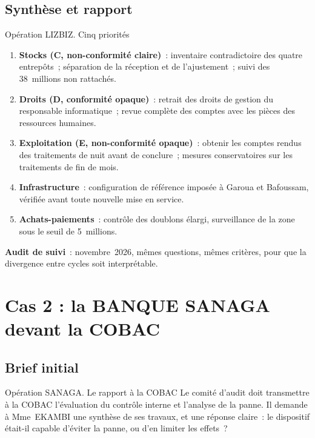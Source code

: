 \subsection{Synthèse et rapport}

\begin{boxscenario}{Opération LIZBIZ. Cinq priorités}
\begin{enumerate}
    \item \textbf{Stocks (C, non-conformité claire)}~: inventaire
          contradictoire des quatre entrepôts~; séparation de la réception
          et de l'ajustement~; suivi des 38~millions non rattachés.
    \item \textbf{Droits (D, conformité opaque)}~: retrait des droits de
          gestion du responsable informatique~; revue complète des comptes
          avec les pièces des ressources humaines.
    \item \textbf{Exploitation (E, non-conformité opaque)}~: obtenir les
          comptes rendus des traitements de nuit avant de conclure~;
          mesures conservatoires sur les traitements de fin de mois.
    \item \textbf{Infrastructure}~: configuration de référence imposée à
          Garoua et Bafoussam, vérifiée avant toute nouvelle mise en
          service.
    \item \textbf{Achats-paiements}~: contrôle des doublons élargi,
          surveillance de la zone sous le seuil de 5~millions.
\end{enumerate}
\textbf{Audit de suivi}~: novembre~2026, mêmes questions, mêmes critères,
pour que la divergence entre cycles soit interprétable.
\end{boxscenario}

\section{Cas 2 : la BANQUE SANAGA devant la COBAC}
\label{sec:c18-sanaga}

\subsection{Brief initial}

\begin{boxscenario}{Opération SANAGA. Le rapport à la COBAC}
Le comité d'audit doit transmettre à la COBAC l'évaluation du contrôle
interne et l'analyse de la panne. Il demande à Mme~EKAMBI une synthèse de
ses travaux, et une réponse claire~: le dispositif était-il capable
d'éviter la panne, ou d'en limiter les effets~?
\end{boxscenario}

